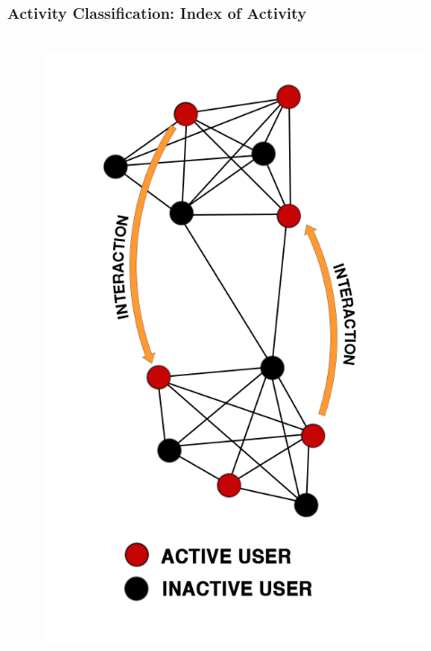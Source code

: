 \documentclass{beamer}
\begin{document}
\begin{frame}
\frametitle{Activity Classification: Index of Activity}
\begin{columns}
	\begin{column}{0.4\textwidth}
		\begin{figure}
			\vspace{-0.5cm}
			\includegraphics[width=1\linewidth]{figures/activeuser}
		\end{figure}
	\end{column}


\end{columns}
\end{frame}
\end{document}
